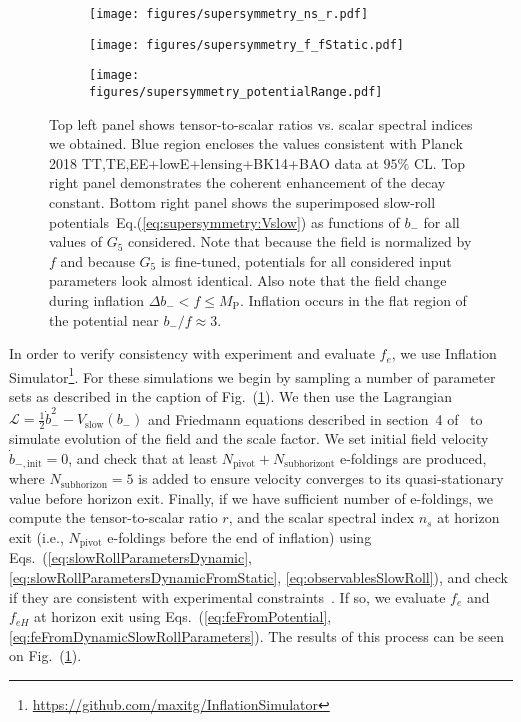 \documentclass[12pt]{article}
\begin{document}
\begin{figure}
  \centering
  \begin{subfigure}{0.45 \textwidth}
    \texttt{[image: figures/supersymmetry\_ns\_r.pdf]}
  \end{subfigure}
  \begin{subfigure}{0.45 \textwidth}
    \texttt{[image: figures/supersymmetry\_f\_fStatic.pdf]}
  \end{subfigure}
  \begin{subfigure}{0.45 \textwidth}
    \texttt{[image: figures/supersymmetry\_potentialRange.pdf]}
  \end{subfigure}
  \caption{\protect
    Top left panel shows tensor-to-scalar ratios vs. scalar spectral indices we obtained.
    Blue region encloses the values consistent with Planck 2018 TT,TE,EE+lowE+lensing+BK14+BAO data at $95\%$ CL.
    Top right panel demonstrates the coherent enhancement of the decay constant.
    Bottom right panel shows the superimposed slow-roll potentials~Eq.(\ref{eq:supersymmetry:Vslow}) as functions of $b_-$ for all values of $G_5$ considered.
    Note that because the field is normalized by $f$ and because $G_5$ is fine-tuned, potentials for all considered input parameters look almost identical.
    Also note that the field change during inflation $\Delta b_- < f \le M_\text{P}$.
    Inflation occurs in the flat region of the potential near $b_- / f \approx 3$.
  } \label{fig:supersymmetry}
\end{figure}

In order to verify consistency with experiment and evaluate $f_e$, we use Inflation Simulator\footnote{\url{https://github.com/maxitg/InflationSimulator}}.
For these simulations we begin by sampling a number of parameter sets as described in the caption of Fig.~(\ref{fig:supersymmetry}).
We then use the Lagrangian $\mathcal{L} = \frac{1}{2} \dot b_-^2 - V_\text{slow}\left(b_-\right)$ and Friedmann equations described in section~4 of~\cite{Nath:2018xxe} to simulate evolution of the field and the scale factor.
We set initial field velocity $\dot b_{-, \text{init}} = 0$, and check that at least $N_\text{pivot} + N_\text{subhorizont}$ e-foldings are produced, where $N_\text{subhorizon} = 5$ is added to ensure velocity converges to its quasi-stationary value before horizon exit.
Finally, if we have sufficient number of e-foldings, we compute the tensor-to-scalar ratio $r$, and the scalar spectral index $n_s$ at horizon exit (i.e., $N_\text{pivot}$ e-foldings before the end of inflation) using Eqs.~(\ref{eq:slowRollParametersDynamic}, \ref{eq:slowRollParametersDynamicFromStatic}, \ref{eq:observablesSlowRoll}), and check if they are consistent with experimental constraints~\cite{Akrami:2018odb}.
If so, we evaluate $f_e$ and $f_{eH}$ at horizon exit using Eqs.~(\ref{eq:feFromPotential}, \ref{eq:feFromDynamicSlowRollParameters}).
The results of this process can be seen on Fig.~(\ref{fig:supersymmetry}).
\end{document}

